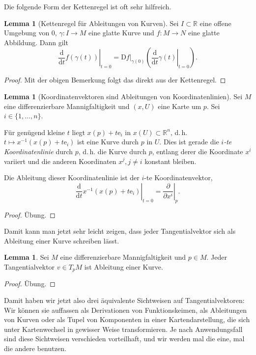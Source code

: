 \documentclass[a4paper]{scrbook}
\numberwithin{equation}{chapter}
\newcommand{\D}{\mathrm{d}}
\newcommand{\DD}{\mathrm{D}}
\newcommand{\e}{\mathrm{e}}
\newcommand{\R}{\mathbb{R}}
\theoremstyle{definition}
\newtheorem{lemma}[defn]{Lemma}
\newcommand{\bewUeb}{\begin{proof}Übung.\end{proof}}
\begin{document}
Die folgende Form der Kettenregel ist oft sehr hilfreich.
\begin{lemma}[Kettenregel für Ableitungen von Kurven]
	Sei $I \subset\R$ eine offene Umgebung von 0, $\gamma\colon I \to M$ eine glatte Kurve und $f\colon M \to N$ eine glatte Abbildung. Dann gilt
	\[\left.\frac{\D}{\D t}f(\gamma(t))\right|_{t=0} = \left.\DD f\right|_{\gamma(0)} \left(\left.\frac{\D}{\D t}\gamma(t)\right|_{t=0}\right).\]

	\begin{proof}
		Mit der obigen Bemerkung folgt das direkt aus der Kettenregel.
	\end{proof}
\end{lemma}

\begin{lemma}[Koordinatenvektoren sind Ableitungen von Koordinatenlinien]
	Sei $M$ eine differenzierbare Mannigfaltigkeit und $(x,U)$ eine Karte um $p$. Sei $i \in \{1,\dots,n\}$.

	Für genügend kleine $t$ liegt $x(p) + t \e_i$ in $x(U) \subset \R^n$, d.\,h. $t \mapsto x^{-1}(x(p) + t\e_i)$ ist eine Kurve durch $p$ in $U$. Dies ist gerade die \emph{$i$-te Koordinatenlinie} durch $p$, d.\,h. die Kurve durch $p$, entlang derer die Koordinate $x^i$ variiert und die anderen Koordinaten $x^j, j\ne i$ konstant bleiben.

	Die Ableitung dieser Koordinatenlinie ist der $i$-te Koordinatenvektor,
	\[\left.\frac{\D}{\D t} x^{-1}(x(p) + t\e_i) \right|_{t=0} = \left.\frac{\partial}{\partial x^i}\right|_p.\]

	\bewUeb
\end{lemma}
Damit kann man jetzt sehr leicht zeigen, dass jeder Tangentialvektor sich als Ableitung einer Kurve schreiben lässt.
\begin{lemma}
	Sei $M$ eine differenzierbare Mannigfaltigkeit und $p\in M$. Jeder Tangentialvektor $v\in T_pM$ ist Ableitung einer Kurve.

	\bewUeb
\end{lemma}

Damit haben wir jetzt also drei äquivalente Sichtweisen auf Tangentialvektoren: Wir können sie auffassen als Derivationen von Funktionskeimen, als Ableitungen von Kurven oder als Tupel von Komponenten in einer Kartendarstellung, die sich unter Kartenwechsel in gewisser Weise transformieren. Je nach Anwendungsfall sind diese Sichtweisen verschieden vorteilhaft, und wir werden mal die eine, mal die andere benutzen.

\end{document}
